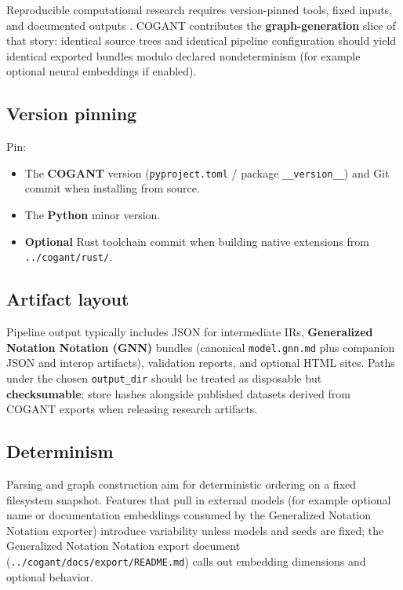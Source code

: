 \documentclass[
]{article}
\providecommand{\tightlist}{%
  \setlength{\itemsep}{0pt}\setlength{\parskip}{0pt}}
\begin{document}
Reproducible computational research requires version-pinned tools, fixed
inputs, and documented outputs \citep{peng2011reproducible}. COGANT
contributes the \textbf{graph-generation} slice of that story: identical
source trees and identical pipeline configuration should yield identical
exported bundles modulo declared nondeterminism (for example optional
neural embeddings if enabled).

\subsection{Version pinning}\label{version-pinning}

Pin:

\begin{itemize}
\tightlist
\item
  The \textbf{COGANT} version (\texttt{pyproject.toml} / package
  \texttt{\_\_version\_\_}) and Git commit when installing from source.
\item
  The \textbf{Python} minor version.
\item
  \textbf{Optional} Rust toolchain commit when building native
  extensions from \texttt{../cogant/rust/}.
\end{itemize}

\subsection{Artifact layout}\label{artifact-layout}

Pipeline output typically includes JSON for intermediate IRs,
\textbf{Generalized Notation Notation (GNN)} bundles (canonical
\texttt{model.gnn.md} plus companion JSON and interop artifacts),
validation reports, and optional HTML sites. Paths under the chosen
\texttt{output\_dir} should be treated as disposable but
\textbf{checksumable}: store hashes alongside published datasets derived
from COGANT exports when releasing research artifacts.

\subsection{Determinism}\label{determinism}

Parsing and graph construction aim for deterministic ordering on a fixed
filesystem snapshot. Features that pull in external models (for example
optional name or documentation embeddings consumed by the Generalized
Notation Notation exporter) introduce variability unless models and
seeds are fixed; the Generalized Notation Notation export document
(\texttt{../cogant/docs/export/README.md}) calls out embedding
dimensions and optional behavior.
\end{document}
